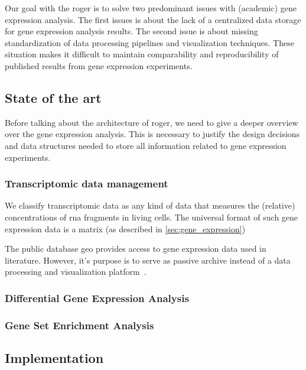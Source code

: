 \documentclass{thesisclass}
\begin{document}
Our goal with the \acrfull{roger} is to solve two predominant issues with (academic) gene expression analysis. 
The first issues is about the lack of a centralized data storage for gene expression analysis results.
The second issue is about missing standardization of data processing pipelines and visualization techniques.
These situation makes it difficult to maintain comparability and reproducibility of published results from gene expression experiments.

\subsection{State of the art}


Before talking about the architecture of \acrshort{roger}, we need to give a deeper overview over the gene expression analysis. This is necessary to justify the design decisions and data structures needed to store all information related to gene expression experiments. 

\subsubsection{Transcriptomic data management}

We classify transcriptomic data as any kind of data that measures the (relative) concentrations of \acrshort{rna} fragments in living cells. 
The universal format of such gene expression data is a matrix (as described in \cref{sec:gene_expression})

The public database \acrfull{geo} provides access to gene expression data used in literature. 
However, it's purpose is to serve as passive archive instead of a data processing and visualization platform~\cite{doi:10.1093/nar/gks1193}.



\subsubsection{Differential Gene Expression Analysis}
\subsubsection{Gene Set Enrichment Analysis}


\subsection{Implementation}
\end{document}
